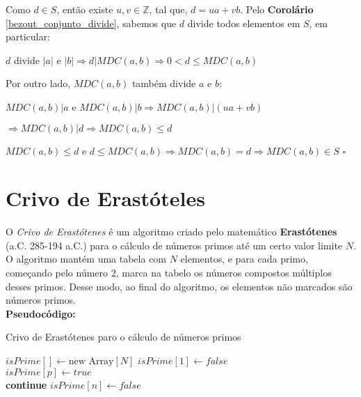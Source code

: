 Como $d \in S$, então existe $u, v\in \mathbb{Z}$, tal que, $d = ua + vb$. Pelo \textbf{Corolário} \autoref{bezout_conjunto_divide}, sabemos que $d$ divide todos elementos em $S$, em particular:

$d$ divide $|a|$ e $|b| \Rightarrow d|MDC(a,b) \Rightarrow 0 < d \leq MDC(a,b)$

Por outro lado, $MDC(a,b)$ também divide $a$ e $b$:

$MDC(a,b)|a$ e $MDC(a,b)|b \Rightarrow MDC(a,b)|(ua + vb)$

$ \Rightarrow MDC(a,b)|d \Rightarrow MDC(a,b) \leq d$

$MDC(a,b)\leq d$ e $d \leq MDC(a,b) \Rightarrow MDC(a,b) = d \Rightarrow MDC(a,b) \in S$ $\square$






\section{Crivo de Erastóteles}

O \textit{Crivo de Erastótenes} é um algoritmo criado pelo matemático \textbf{Erastótenes} (a.C. 285-194 a.C.) para o cálculo de números primos
até um certo valor limite $N$.
O algoritmo mantém uma tabela com $N$ elementos, e para cada primo, começando pelo número $2$, marca na tabelo os números compostos múltiplos desses primos.
Desse modo, ao final do algoritmo, os elementos não marcados são números primos.\\

\textbf{Pseudocódigo:}
\begin{algorithm}
\caption{Crivo de Erastótenes paro o cálculo de números primos}\label{crivo_erastotenes}
\begin{algorithmic}[1]
\State $isPrime[] \gets \text{new Array}[N]$ 
\State $isPrime[1] \gets false$
\\
\State $isPrime[p] \gets true$
\EndFor
\\
\State \textbf{continue}
\EndIf
{}
\State $isPrime[n] \gets false$
\EndFor
\EndFor
\\
\State {}
\EndProcedure
\end{algorithmic}
\end{algorithm}

